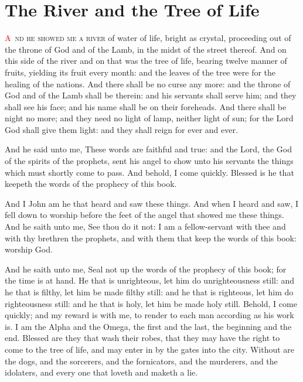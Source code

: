
\chapter{The River and the Tree of Life}
\lettrine[lines=3,slope=0.5em]{\textcolor{red}{A}}{\ nd he showed me a river} of water of life, bright as crystal, proceeding out of the throne of God and of the Lamb, 
 in the midst of the street thereof. And on this side of the river and on that was the tree of life, bearing twelve manner of fruits, yielding its fruit every month: and the leaves of the tree were for the healing of the nations. 
 And there shall be no curse any more: and the throne of God and of the Lamb shall be therein: and his servants shall serve him; 
 and they shall see his face; and his name shall be on their foreheads. 
 And there shall be night no more; and they need no light of lamp, neither light of sun; for the Lord God shall give them light: and they shall reign for ever and ever.

 And he said unto me, These words are faithful and true: and the Lord, the God of the spirits of the prophets, sent his angel to show unto his servants the things which must shortly come to pass. 
 And behold, I come quickly. Blessed is he that keepeth the words of the prophecy of this book.

 And I John am he that heard and saw these things. And when I heard and saw, I fell down to worship before the feet of the angel that showed me these things. 
 And he saith unto me, See thou do it not: I am a fellow-servant with thee and with thy brethren the prophets, and with them that keep the words of this book: worship God.

 And he saith unto me, Seal not up the words of the prophecy of this book; for the time is at hand. 
 He that is unrighteous, let him do unrighteousness still: and he that is filthy, let him be made filthy still: and he that is righteous, let him do righteousness still: and he that is holy, let him be made holy still. 
 Behold, I come quickly; and my reward is with me, to render to each man according as his work is. 
 I am the Alpha and the Omega, the first and the last, the beginning and the end. 
 Blessed are they that wash their robes, that they may have the right to come to the tree of life, and may enter in by the gates into the city. 
 Without are the dogs, and the sorcerers, and the fornicators, and the murderers, and the idolaters, and every one that loveth and maketh a lie.

